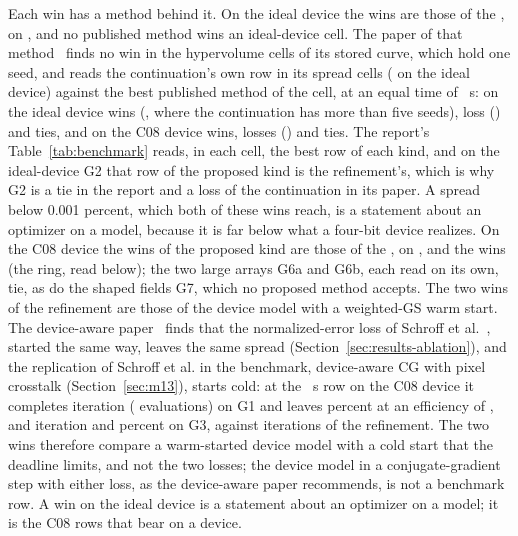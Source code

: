 Each win has a method behind it. On the ideal device the \benchWinsIdealProposed{} wins are those of the \dlWinIdealProposedMethods{}, on \dlWinIdealProposedCells{}, and no published method wins an ideal-device cell. The paper of that method~\cite{b5paper} finds no win in the hypervolume cells of its stored curve, which hold one seed, and reads the continuation's own row in its spread cells ( on the ideal device) against the best published method of the cell, at an equal time of ~s: on the ideal device  wins (, where the continuation has more than five seeds),  loss () and  ties, and on the C08 device  wins,  losses () and  ties. The report's Table~\ref{tab:benchmark} reads, in each cell, the best row of each kind, and on the ideal-device G2 that row of the proposed kind is the refinement's, which is why G2 is a tie in the report and a loss of the continuation in its paper. A spread below 0.001 percent, which both of these wins reach, is a statement about an optimizer on a model, because it is far below what a four-bit device realizes. On the C08 device the \benchWinsDeviceProposed{} wins of the proposed kind are those of the \dlWinDeviceProposedMethods{}, on \dlWinDeviceProposedCells{}, and the \dlWinDevicePublishedMethods{} wins \dlWinDevicePublishedCells{} (the ring, read below); the two large arrays G6a and G6b, each read on its own, tie, as do the shaped fields G7, which no proposed method accepts. The two wins of the refinement are those of the device model with a weighted-GS warm start. The device-aware paper~\cite{companion} finds that the normalized-error loss of Schroff et al.~\cite{schroff}, started the same way, leaves the same spread (Section~\ref{sec:results-ablation}), and the replication of Schroff et al. in the benchmark, device-aware CG with pixel crosstalk (Section~\ref{sec:m13}), starts cold: at the \dlReadS{}~s row on the C08 device it completes \scGoneIter{} iteration (\scGoneEval{} evaluations) on G1 and leaves \scGoneSig{} percent at an efficiency of \scGoneEff{}, and \scGthreeIter{} iteration and \scGthreeSig{} percent on G3, against \boGoneIter{} iterations of the refinement. The two wins therefore compare a warm-started device model with a cold start that the deadline limits, and not the two losses; the device model in a conjugate-gradient step with either loss, as the device-aware paper recommends, is not a benchmark row. A win on the ideal device is a statement about an optimizer on a model; it is the C08 rows that bear on a device.

